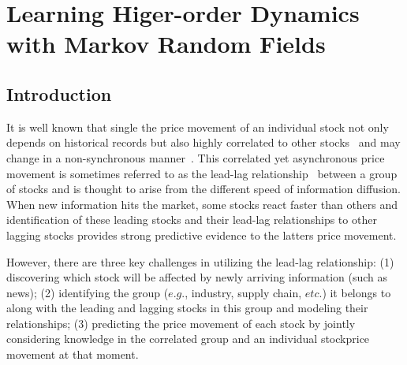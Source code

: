 
\chapter{Learning Higer-order Dynamics with Markov Random Fields}
\label{cha:und}

\section{Introduction}
\label{sec:intro}

It is well known that single the price movement of an individual
stock not only depends on historical records but also highly
correlated to other
stocks~\cite{lo1990contrarian,mech1993portfolio} and may change
in a non-synchronous
manner~\cite{lo1990contrarian,brennan1993investment}. This
correlated yet asynchronous price movement is sometimes referred
to as the lead-lag relationship~\cite{hou2007industry} between a
group of stocks and is thought to arise from the different speed
of information
diffusion\cite{lo1990contrarian,badrinath1995shepherds,mcqueen1996delayed}.
When new information hits the market, some stocks react faster
than others and identification of these leading stocks and their
lead-lag relationships to other lagging stocks provides strong
predictive evidence to the latter\textquotesingle s price
movement.

However, there are three key challenges in utilizing the lead-lag
relationship: (1) discovering which stock will be affected by
newly arriving information (such as news); (2) identifying the
group ($e.g.$, industry, supply chain, $etc.$) it belongs to along with
the leading and lagging stocks in this group and
modeling their relationships; (3) predicting the price movement of
each stock by jointly considering knowledge in the correlated
group and an individual stock\textquotesingle price movement at
that moment.

